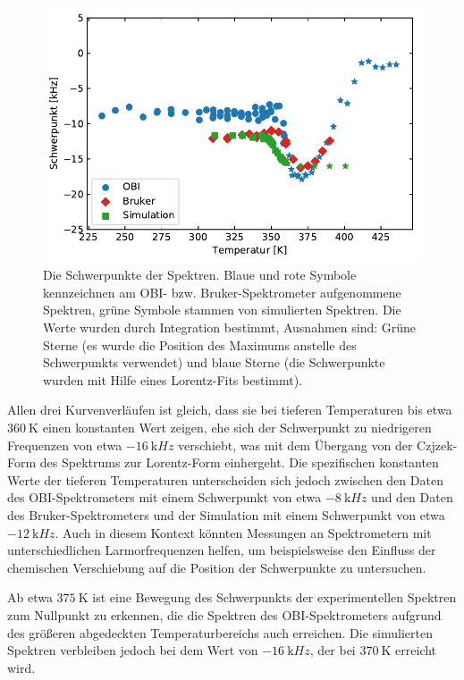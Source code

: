 \begin{figure}
	\begin{center}
		\includegraphics[width=.9\textwidth]{graphics/plot/mean4.pdf}
	\end{center}
	\caption{Die Schwerpunkte der Spektren. Blaue und rote Symbole kennzeichnen am OBI- bzw. Bruker-Spektrometer aufgenommene Spektren, grüne Symbole stammen von simulierten Spektren. Die Werte wurden durch Integration bestimmt, Ausnahmen sind: Grüne Sterne (es wurde die Position des Maximums anstelle des Schwerpunkts verwendet) und blaue Sterne (die Schwerpunkte wurden mit Hilfe eines Lorentz-Fits bestimmt).} \label{fig:res:spek_mean}
\end{figure}

Allen drei Kurvenverläufen ist gleich, dass sie bei tieferen Temperaturen bis etwa $\SI{360}{\kelvin}$ einen konstanten Wert zeigen, ehe sich der Schwerpunkt zu niedrigeren Frequenzen von etwa $\SI{-16}{\kilo Hz}$ verschiebt, was mit dem Übergang von der Czjzek-Form des Spektrums zur Lorentz-Form einhergeht. Die spezifischen konstanten Werte der tieferen Temperaturen unterscheiden sich jedoch zwischen den Daten des OBI-Spektrometers mit einem Schwerpunkt von etwa $\SI{-8}{\kilo Hz}$ und den Daten des Bruker-Spektrometers und der Simulation mit einem Schwerpunkt von etwa $\SI{-12}{\kilo Hz}$. Auch in diesem Kontext könnten Messungen an Spektrometern mit unterschiedlichen Larmorfrequenzen helfen, um beispielsweise den Einfluss der chemischen Verschiebung auf die Position der Schwerpunkte zu untersuchen.

Ab etwa $\SI{375}{\kelvin}$ ist eine Bewegung des Schwerpunkts der experimentellen Spektren zum Nullpunkt zu erkennen, die die Spektren des OBI-Spektrometers aufgrund des größeren abgedeckten Temperaturbereichs auch erreichen. Die simulierten Spektren verbleiben jedoch bei dem Wert von $\SI{-16}{\kilo Hz}$, der bei $\SI{370}{\kelvin}$ erreicht wird.

